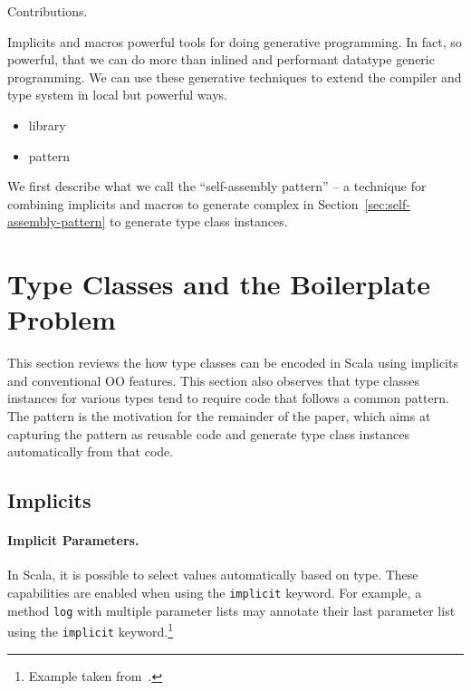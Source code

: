 \documentclass[preprint]{sigplanconf}
\newcommand{\term}[1]{\mbox{\texttt{#1}}}
\begin{document}
Contributions.

Implicits and macros powerful tools for doing generative programming. In fact, so powerful, that we can do more than inlined and performant datatype generic programming. We can use these generative techniques to extend the compiler and type system in local but powerful ways.

\begin{itemize}
\item library
\item pattern
\end{itemize}

We first describe what we call the ``self-assembly pattern'' -- a technique for combining implicits and macros to generate complex in Section~\ref{sec:self-assembly-pattern} to generate type class instances.

\section{Type Classes and the Boilerplate Problem}
\label{sec:background}

This section reviews the how type classes can be encoded in Scala 
using implicits and conventional OO features. This section also
observes that type classes instances for various types tend to require 
code that follows a common pattern. The pattern is the motivation 
for the remainder of the paper, which aims at capturing the
pattern as reusable code and generate type class instances
automatically from that code. 


\begin{comment}
\subsection{Singletons}
\label{sec:singletons}

...

\paragraph{Companion Objects} ...
\end{comment}

\subsection{Implicits}
\label{sec:implicits}

\paragraph{Implicit Parameters.} In Scala, it is possible to select values
automatically based on type. These capabilities are enabled when using the
\term{implicit} keyword. For example, a method \term{log} with multiple
parameter lists may annotate their last parameter list using the
\term{implicit} keyword.\footnote{Example taken from~\cite{Oliveira2010}.}
\end{document}
